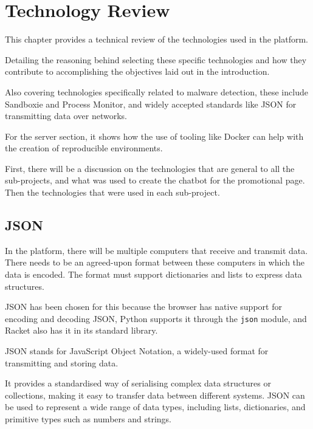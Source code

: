 \chapter{Technology Review}

This chapter provides a technical review of the technologies used in the platform.

Detailing the reasoning behind selecting these specific technologies
and how they contribute to accomplishing the objectives laid out in the introduction.

Also covering technologies specifically related to malware detection,
these include Sandboxie and Process Monitor,
and widely accepted standards like JSON for transmitting data over networks.

For the server section, it shows how the use of tooling like Docker
can help with the creation of reproducible environments.

First, there will be a discussion on the technologies that are general
to all the sub-projects,
and what was used to create the chatbot for the promotional page.
Then the technologies that were used in each sub-project.

\section{JSON}
In the platform, there will be multiple computers that receive and transmit data.
There needs to be an agreed-upon format between these
computers in which the data is encoded.
The format must support dictionaries and lists to express data structures.

JSON has been chosen for this because the browser has
native support for encoding and decoding JSON,
Python supports it through the \texttt{json} module,
and Racket also has it in its standard library.

JSON stands for JavaScript Object Notation,
a widely-used format for transmitting and storing data.

It provides a standardised way of serialising complex data structures or collections,
making it easy to transfer data between different systems.
JSON can be used to represent a wide range of data types,
including lists, dictionaries, and primitive types such as numbers and strings. \cite{ECMA-404}

